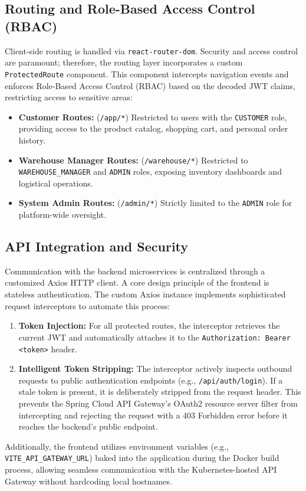 \documentclass[12pt,a4paper]{report}
\begin{document}
\subsection{Routing and Role-Based Access Control (RBAC)}
Client-side routing is handled via \texttt{react-router-dom}. Security and access control are paramount; therefore, the routing layer incorporates a custom \texttt{ProtectedRoute} component. This component intercepts navigation events and enforces Role-Based Access Control (RBAC) based on the decoded JWT claims, restricting access to sensitive areas:
\begin{itemize}
    \item \textbf{Customer Routes:} (\texttt{/app/*}) Restricted to users with the \texttt{CUSTOMER} role, providing access to the product catalog, shopping cart, and personal order history.
    \item \textbf{Warehouse Manager Routes:} (\texttt{/warehouse/*}) Restricted to \texttt{WAREHOUSE\_MANAGER} and \texttt{ADMIN} roles, exposing inventory dashboards and logistical operations.
    \item \textbf{System Admin Routes:} (\texttt{/admin/*}) Strictly limited to the \texttt{ADMIN} role for platform-wide oversight.
\end{itemize}

\subsection{API Integration and Security}
Communication with the backend microservices is centralized through a customized Axios HTTP client. A core design principle of the frontend is stateless authentication. The custom Axios instance implements sophisticated request interceptors to automate this process:
\begin{enumerate}
    \item \textbf{Token Injection:} For all protected routes, the interceptor retrieves the current JWT and automatically attaches it to the \texttt{Authorization: Bearer <token>} header.
    \item \textbf{Intelligent Token Stripping:} The interceptor actively inspects outbound requests to public authentication endpoints (e.g., \texttt{/api/auth/login}). If a stale token is present, it is deliberately stripped from the request header. This prevents the Spring Cloud API Gateway's OAuth2 resource server filter from intercepting and rejecting the request with a 403 Forbidden error before it reaches the backend's public endpoint.
\end{enumerate}
Additionally, the frontend utilizes environment variables (e.g., \texttt{VITE\_API\_GATEWAY\_URL}) baked into the application during the Docker build process, allowing seamless communication with the Kubernetes-hosted API Gateway without hardcoding local hostnames.
\end{document}
